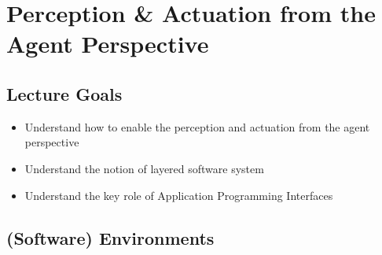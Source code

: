 \hypertarget{perception-actuation-from-the-agent-perspective}{%
\section{Perception \& Actuation from the Agent
Perspective}\label{perception-actuation-from-the-agent-perspective}}

\hypertarget{lecture-goals}{%
\subsection{Lecture Goals}\label{lecture-goals}}

\begin{itemize}
\item
  Understand how to enable the perception and actuation from the agent
  perspective
\item
  Understand the notion of layered software system
\item
  Understand the key role of Application Programming Interfaces
\end{itemize}

\hypertarget{software-environments}{%
\subsection{(Software) Environments}\label{software-environments}}

